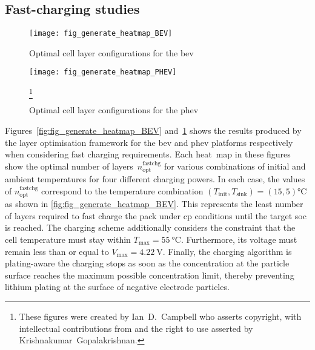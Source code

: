 \subsection{Fast-charging studies}

\begin{figure}[p]
    \begin{minipage}[t]{\textwidth}
        \centering
        \texttt{[image: fig\_generate\_heatmap\_BEV]}
        \captionsetup{labelsep=note}
        \caption[Optimal cell layer configurations for the \gls{bev}, presented for a range of fast charging powers and thermal conditions]{Optimal cell layer configurations for the \gls{bev}}
        \label{fig:fig_generate_heatmap_BEV}
        \setcounter{footnote}{8}
        \vspace*{\floatsep}
        \texttt{[image: fig\_generate\_heatmap\_PHEV]}
        \caption[Optimal cell layer configurations for the \gls{phev}, presented for a range of
        fast charging powers and thermal conditions]{Optimal cell layer configurations for the \gls{phev}}
        \label{fig:fig_generate_heatmap_PHEV}
        \mpfootnotes[1]
        \footnote{These figures were created by \mbox{Ian D.\ Campbell} who asserts copyright,
            with intellectual contributions from and the right to use asserted by
        \mbox{Krishnakumar Gopalakrishnan}.}
    \end{minipage}
\end{figure}

Figures~\ref{fig:fig_generate_heatmap_BEV}
and~\ref{fig:fig_generate_heatmap_PHEV} shows the results  produced by the layer
optimisation framework  for the \gls{bev} and  \gls{phev} platforms respectively
when  considering fast  charging requirements.  Each heat~map  in these  figures
show  the optimal  number  of  layers~$n^\text{fastchg}_\text{opt}$ for  various
combinations of  initial and  ambient temperatures  for four  different charging
powers. In each case, the  values of $n^\text{fastchg}_\text{opt}$ correspond to
the  temperature  combination  \mbox{$(T_\text{init},T_\text{sink})  =  (15,  5)
\si{\degreeCelsius}$}  as  shown  in  \cref{fig:fig_generate_heatmap_BEV}.  This
represents the  least number of  layers required to  fast charge the  pack under
\gls{cp} conditions until  the target \gls{soc} is reached.  The charging scheme
additionally considers the constraint that the cell temperature must stay within
\mbox{$T_\text{max}=  \SI{55}{\degreeCelsius}$}. Furthermore,  its voltage  must
remain less than or equal  to \mbox{$V_\text{max} = \SI{4.22}{\volt}$}. Finally,
the charging algorithm is plating-aware \ie{}  the charging stops as soon as the
concentration at the particle surface reaches the maximum possible concentration
limit, thereby preventing  lithium plating at the surface  of negative electrode
particles.


